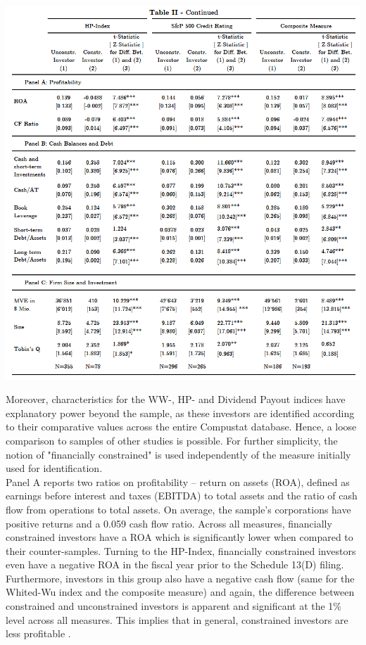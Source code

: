 \documentclass[12pt]{article}
\begin{document}
\begin{table}[!htbp]
	\centering
	\begin{adjustbox}{width=\textwidth}
		\includegraphics{summary2final}
	\end{adjustbox}
\end{table}
\noindent Moreover, characteristics for the WW-, HP- and Dividend Payout indices have explanatory power beyond the sample, as these investors are identified according to their comparative values across the entire Compustat database. Hence, a loose comparison to samples of other studies is possible. For further simplicity, the notion of "financially constrained" is used independently of the measure initially used for identification. \\
Panel A reports two ratios on profitability -- return on assets (ROA), defined as earnings before interest and taxes (EBITDA) to total assets and the ratio of cash flow from operations to total assets. On average, the sample's corporations have positive returns and a 0.059 cash flow ratio. Across all measures, financially constrained investors have a ROA which is significantly lower when compared to their counter-samples. Turning to the HP-Index, financially constrained investors even have a negative ROA in the fiscal year prior to the Schedule 13(D) filing. Furthermore, investors in this group also have a negative cash flow (same for the Whited-Wu index and the composite measure) and again, the difference between constrained and unconstrained investors is apparent and significant at the 1\% level across all measures. This implies that in general, constrained investors are less profitable \citep[p.544]{Whited2006}.\\
\end{document}
